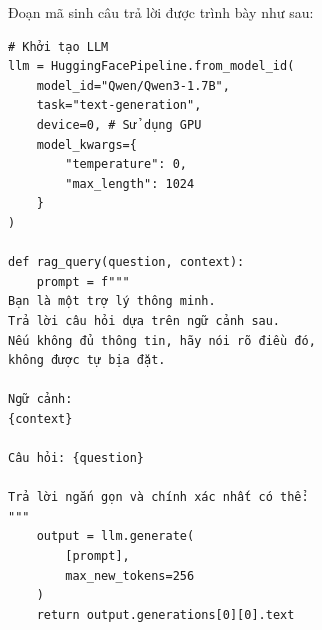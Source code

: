 Đoạn mã sinh câu trả lời được trình bày như sau:
 
\begin{verbatim}
# Khởi tạo LLM
llm = HuggingFacePipeline.from_model_id(
    model_id="Qwen/Qwen3-1.7B",
    task="text-generation",
    device=0, # Sử dụng GPU
    model_kwargs={
        "temperature": 0,
        "max_length": 1024
    }
)
 
def rag_query(question, context):
    prompt = f"""
Bạn là một trợ lý thông minh.
Trả lời câu hỏi dựa trên ngữ cảnh sau.
Nếu không đủ thông tin, hãy nói rõ điều đó,
không được tự bịa đặt.
 
Ngữ cảnh:
{context}
 
Câu hỏi: {question}
 
Trả lời ngắn gọn và chính xác nhất có thể:
"""
    output = llm.generate(
        [prompt],
        max_new_tokens=256
    )
    return output.generations[0][0].text
\end{verbatim}